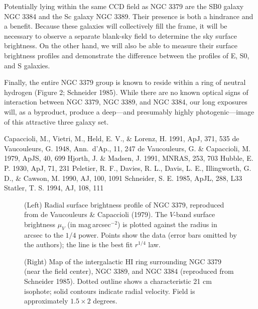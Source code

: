 Potentially lying within the same CCD field as NGC 3379 are the SB0
galaxy NGC 3384 and the Sc galaxy NGC 3389. Their presence is both a
hindrance and a benefit. Because these galaxies will collectively fill
the frame, it will be necessary to observe a separate blank-sky field
to determine the sky surface brightness. On the other hand, we will also
be able to measure their surface brightness profiles and demonstrate the
difference between the profiles of E, S0, and S galaxies.

Finally, the entire NGC 3379 group is known to reside within a ring of
neutral hydrogen (Figure 2; Schneider 1985). While there
are no known optical signs of interaction between NGC 3379, NGC 3389, and
NGC 3384, our long exposures will, as a byproduct, produce a deep---and
presumably highly photogenic---image of this attractive three galaxy set.

\clearpage

\begin{references}
 Capaccioli, M., Vietri, M., Held, E. V., \& Lorenz, H. 1991,
        ApJ, 371, 535
 de Vaucouleurs, G. 1948, Ann.\ d'Ap., 11, 247
 de Vaucouleurs, G. \& Capaccioli, M. 1979, ApJS, 40, 699
 Hjorth, J. \& Madsen, J. 1991, MNRAS, 253, 703
 Hubble, E. P. 1930, ApJ, 71, 231
 Peletier, R. F., Davies, R. L., Davis, L. E., Illingworth,
        G. D., \& Cawson, M. 1990, AJ, 100, 1091
 Schneider, S. E. 1985, ApJL, 288, L33
 Statler, T. S. 1994, AJ, 108, 111
\end{references}

\begin{figure}
\caption{(Left) Radial surface brightness profile of NGC 3379, reproduced
from de Vaucouleurs \& Capaccioli (1979). The $V$-band surface brightness
$\mu_V$ (in mag$\,$arcsec$^{-2}$) is plotted against the radius in arcsec to
the $1/4$ power. Points show the data (error bars omitted by the authors);
the line is the best fit $r^{1/4}$ law.}
\caption{(Right) Map of the intergalactic HI ring surrounding NGC 3379
(near the field center),
NGC 3389, and NGC 3384 (reproduced from Schneider 1985). Dotted outline shows
a characteristic 21 cm isophote; solid contours indicate radial
velocity. Field is approximately $1.5 \times 2$ degrees.}
\end{figure}

